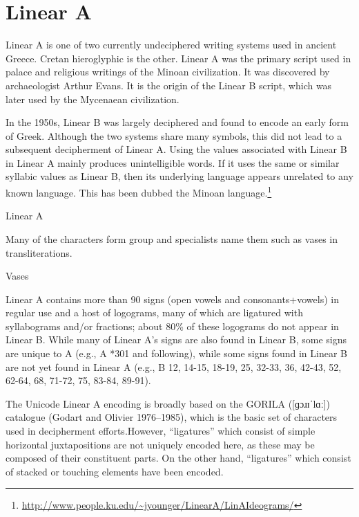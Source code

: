 \section{Linear A}
\label{s:lineara}
\newfontfamily{}

Linear A is one of two currently undeciphered writing systems used in ancient Greece. Cretan hieroglyphic is the other. Linear A was the primary script used in palace and religious writings of the Minoan civilization. It was discovered by archaeologist Arthur Evans. It is the origin of the Linear B script, which was later used by the Mycenaean civilization.

In the 1950s, Linear B was largely deciphered and found to encode an early form of Greek. Although the two systems share many symbols, this did not lead to a subsequent decipherment of Linear A. Using the values associated with Linear B in Linear A mainly produces unintelligible words. If it uses the same or similar syllabic values as Linear B, then its underlying language appears unrelated to any known language. This has been dubbed the Minoan language.\footnote{\url{http://www.people.ku.edu/~jyounger/LinearA/LinAIdeograms/}}

\begin{scriptexample}[]{Linear A}
\end{scriptexample}

Many of the characters form group and specialists name them such as vases in transliterations.

\begin{scriptexample}[]{Vases}
\begin{center}
\end{center}
\end{scriptexample}

Linear A contains more than 90 signs (open vowels and consonants+vowels) in regular use and a host of
logograms, many of which are ligatured with syllabograms and/or fractions; about 80\% of these
logograms do not appear in Linear B. While many of Linear A’s signs are also found in Linear B, some
signs are unique to A (e.g., A *301 and following), while some signs found in Linear B are not yet found
in Linear A (e.g., B 12, 14-15, 18-19, 25, 32-33, 36, 42-43, 52, 62-64, 68, 71-72, 75, 83-84, 89-91).

The Unicode Linear A encoding is broadly based on the GORILA ([{\arial ɡɔɹɪˈlɑː}]) catalogue
(Godart and Olivier 1976–1985), which is the basic set of characters used in decipherment efforts.However, “ligatures” which consist of simple horizontal juxtapositions are not uniquely encoded here, as
these may be composed of their constituent parts. On the other hand, “ligatures” which consist of stacked
or touching elements have been encoded. 





